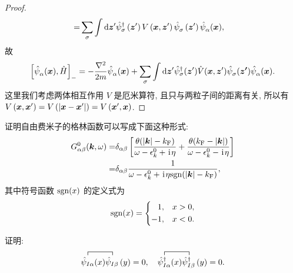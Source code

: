 \begin{proof}
\begin{align}
=& \sum_\sigma \int \mathrm{d} \boldsymbol{z}^{\prime} \hat{\psi}_\sigma^{\dagger}\left(\boldsymbol{z}^{\prime}\right) V\left(\boldsymbol{x}, \boldsymbol{z}^{\prime}\right) \hat{\psi}^{ }_\sigma\left(\boldsymbol{z}^{\prime}\right) \hat{\psi}^{ }_\alpha(\boldsymbol{x}),
\end{align}
故
   \begin{equation}
           \left[ \hat\psi^{ }_\alpha(\boldsymbol{x}),\hat{H} \right]_-= -\frac{\nabla^2}{2m} \hat{\psi}^{ }_\alpha(\boldsymbol{x})+\sum_\sigma\int\mathrm{d}\boldsymbol{z}' \hat{\psi}_\sigma^\dagger(\boldsymbol{z}') \hat{V}(\boldsymbol{x},\boldsymbol{z}')\hat{\psi}^{ }_\sigma(\boldsymbol{z'})\hat{\psi}^{ }_\alpha(\boldsymbol{x}).
    \end{equation}
这里我们考虑两体相互作用 $V$ 是厄米算符, 且只与两粒子间的距离有关, 所以有 $V\left(\boldsymbol{x}, \boldsymbol{x}^{\prime}\right)=V\left(\left|\boldsymbol{x}-\boldsymbol{x}^{\prime}\right|\right)=V\left(\boldsymbol{x}^{\prime}, \boldsymbol{x}\right)$.
\end{proof}

\begin{question2}{}{}
    证明自由费米子的格林函数可以写成下面这种形式:
    \begin{align}
            G_{\alpha\beta}^0(\boldsymbol{k},\omega)=&\delta_{\alpha\beta}\left[ \frac{\theta(|\boldsymbol{k}|-k_{\mathrm{F}})}{\omega-\epsilon_k^0+\hspace{0.1em}\mathrm{i}\hspace{0.1em}\eta}+\frac{\theta(k_{\mathrm{F}}-|\boldsymbol{k}|)}{\omega-\epsilon_k^0-\hspace{0.1em}\mathrm{i}\hspace{0.1em}\eta} \right]\nonumber\\
            =&\delta_{\alpha\beta}\frac{1}{\omega-\epsilon_k^0+\hspace{0.1em}\mathrm{i}\hspace{0.1em}\eta\mathrm{sgn}(|\boldsymbol{k}|-k_{\mathrm{F}})},
        \end{align}
    其中符号函数 $\mathrm{sgn}(x)$ 的定义式为
    \begin{equation}
        \mathrm{sgn}(x)=\left\{ \begin{aligned}
            1,& \quad x>0,\\
            -1,& \quad x<0.
        \end{aligned} \right.
    \end{equation}
\end{question2}
\begin{question2}{}{}
    证明:
    \begin{equation}
    \contraction{}{\hat{\psi}_{I \alpha}}{(x)}{\hat{\psi}_{I \beta}}
    \hat{\psi}_{I \alpha}(x) \hat{\psi}_{I \beta}\left(y\right)=0,\quad
    \contraction{}{\hat{\psi}^{\dagger}_{I \alpha}}{(x)}{\hat{\psi}^{\dagger}_{I \beta}}
    \hat{\psi}^{\dagger}_{I \alpha}(x) \hat{\psi}^{\dagger}_{I \beta}\left(y\right)=0.
    \end{equation}
    \end{question2}

